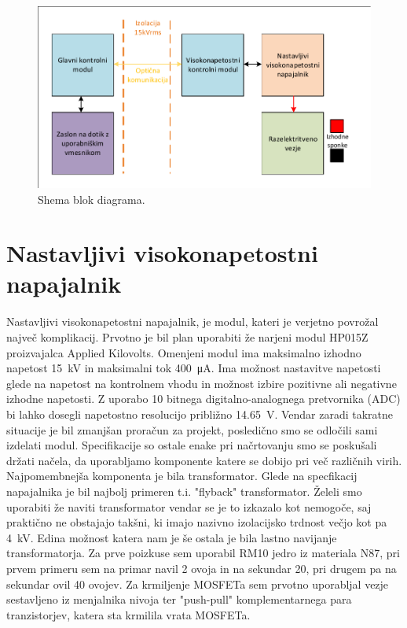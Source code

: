 \documentclass[a4paper,twoside,openright,12pt,slovene]{book}
\begin{document}
\begin{figure}[h]
    \centering
    \includegraphics[width=1\columnwidth]{Sheme/Osnovna blok shema poenostavljena.pdf}
    \caption{\label{BlokDiagramShema} Shema blok diagrama.}
\end{figure}



\section{Nastavljivi visokonapetostni napajalnik}

 Nastavljivi visokonapetostni napajalnik, je modul, kateri je verjetno povrožal največ komplikacij. Prvotno je bil plan uporabiti že narjeni modul HP015Z proizvajalca Applied Kilovolts. Omenjeni modul ima maksimalno izhodno napetost \SI{15}{\kilo\volt} in maksimalni tok \SI{400}{\micro\ampere}. Ima možnost nastavitve napetosti glede na napetost na kontrolnem vhodu in možnost izbire pozitivne ali negativne izhodne napetosti. Z uporabo 10 bitnega digitalno-analognega pretvornika (ADC) bi lahko dosegli napetostno resolucijo približno \SI{14,65}{\volt}.
Vendar zaradi takratne situacije je bil zmanjšan proračun za projekt, posledično smo se odločili sami izdelati modul. Specifikacije so ostale enake pri načrtovanju smo se poskušali držati načela, da uporabljamo komponente katere se dobijo pri več različnih virih. Najpomembnejša komponenta je bila transformator. Glede na specfikacij napajalnika je bil najbolj primeren t.i. "flyback" transformator. Želeli smo uporabiti že naviti transformator vendar se je to izkazalo kot nemogoče, saj praktično ne obstajajo takšni, ki imajo nazivno izolacijsko trdnost večjo kot pa \SI{4}{\kilo\volt}. 
Edina možnost katera nam je še ostala je bila lastno navijanje transformatorja. Za prve poizkuse sem uporabil RM10 jedro iz materiala N87, pri prvem primeru sem na primar navil 2 ovoja in na sekundar 20, pri drugem pa na sekundar ovil 40 ovojev. %
Za krmiljenje MOSFETa sem prvotno uporabljal vezje sestavljeno iz menjalnika nivoja ter "push-pull" komplementarnega para tranzistorjev, katera sta krmilila vrata MOSFETa.
\end{document}
